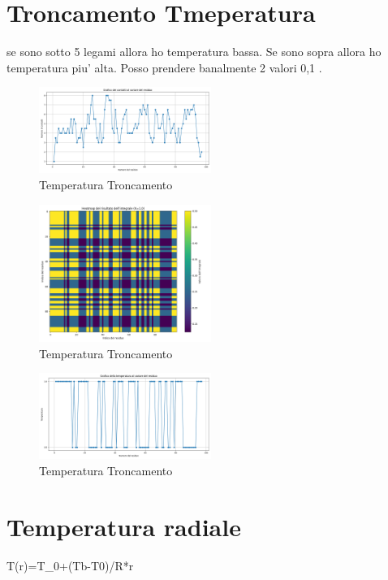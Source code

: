 \documentclass{article}
\begin{document}
\section{Troncamento Tmeperatura}
se sono sotto 5 legami allora ho temperatura bassa.
Se sono sopra allora ho temperatura piu' alta.
Posso prendere banalmente 2 valori 0,1 .
\begin{figure}[H]
    \centering
    \includegraphics[width=0.5\textwidth]{"images/2m10_2_temperature_contact_cutoff.png"}
    \caption{ Temperatura Troncamento }
\end{figure}
\begin{figure}[H]
    \centering
    \includegraphics[width=0.5\textwidth]{"images/2m10_2_temperature_correlation_cutoff.png"}
    \caption{ Temperatura Troncamento  }
\end{figure}
\begin{figure}[H]
    \centering
    \includegraphics[width=0.5\textwidth]{"images/2m10_2_temperature_cutoff.png"}
    \caption{ Temperatura Troncamento  }
\end{figure}

\section{Temperatura radiale}
T(r)=T_0+(Tb-T0)/R*r
\end{document}
